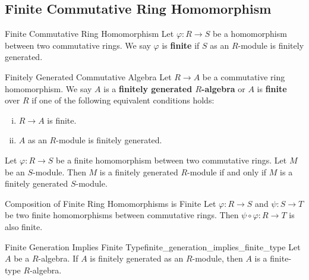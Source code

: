 \subsection{Finite Commutative Ring Homomorphism}

\begin{definition}{Finite Commutative Ring Homomorphism}{}
    Let $\varphi:R\to S$ be a homomorphism between two commutative rings. We say $\varphi$ is \textbf{finite} if $S$ as an $R$-module is finitely generated.
\end{definition}

\begin{definition}{Finitely Generated Commutative Algebra}{}
    Let $R\to A$ be a commutative ring homomorphism. We say $A$ is a \textbf{finitely generated $R$-algebra} or $A$ is \textbf{finite} over $R$ if one of the following equivalent conditions holds:
    \begin{enumerate}[(i)]
        \item $R\to A$ is finite.
        \item $A$ as an $R$-module is finitely generated.
    \end{enumerate} 
\end{definition}

\begin{proposition}{}{}
    Let $\varphi:R\to S$ be a finite homomorphism between two commutative rings. Let $M$ be an $S$-module. Then $M$ is a finitely generated $R$-module if and only if $M$ is a finitely generated $S$-module.
\end{proposition}

\begin{proposition}{Composition of Finite Ring Homomorphisms is Finite}{}
    Let $\varphi:R\to S$ and $\psi:S\to T$ be two finite homomorphisms between commutative rings. Then $\psi\circ\varphi:R\to T$ is also finite.
\end{proposition}





\begin{proposition}{Finite Generation Implies Finite Type}{finite_generation_implies_finite_type}
    Let $A$ be a $R$-algebra. If $A$ is finitely generated as an $R$-module, then $A$ is a finite-type $R$-algebra.
\end{proposition}

